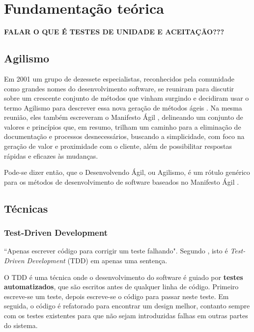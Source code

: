 \chapter{Fundamentação teórica}

\textbf{FALAR O QUE É TESTES DE UNIDADE E ACEITAÇÃO???}

\section{Agilismo}

Em 2001 um grupo de dezessete especialistas, reconhecidos pela comunidade como grandes nomes do desenvolvimento software, se reuniram para discutir sobre um crescente conjunto de métodos que vinham surgindo e decidiram usar o termo Agilismo para descrever essa nova geração de métodos ágeis \cite{AgileStory}. Na mesma reunião, eles também escreveram o Manifesto Ágil \cite{AgileManifesto}, delineando um conjunto de valores e princípios que, em resumo, trilham um caminho para a eliminação de documentação e processos desnecessários, buscando a simplicidade, com foco na geração de valor e proximidade com o cliente, além de possibilitar respostas rápidas e eficazes às mudanças.

Pode-se dizer então, que o Desenvolvendo Ágil, ou Agilismo, é um rótulo genérico para os métodos de desenvolvimento de software baseados no Manifesto Ágil \cite{BDDRodrigo}.


\section{Técnicas}

\subsection{Test-Driven Development}
\label{sub:tdd}
``Apenas escrever código para corrigir um teste falhando". Segundo , isto é \textit{Test-Driven Development} (TDD) \cite{TDDbyExample} em apenas uma sentença.

O TDD é uma técnica onde o desenvolvimento do software é guiado por \textbf{testes automatizados}, que são escritos antes de qualquer linha de código. Primeiro escreve-se um teste, depois escreve-se o código para passar neste teste. Em seguida, o código é refatorado para encontrar um design melhor, contanto sempre com os testes existentes para que não sejam introduzidas falhas em outras partes do sistema.

